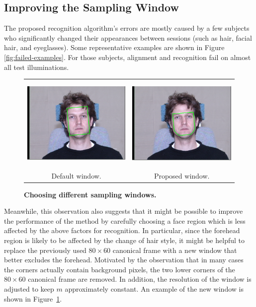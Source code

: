 \subsection{Improving the Sampling Window}
The proposed recognition algorithm's errors are mostly caused by a few subjects who
significantly changed their appearances between sessions (such
as hair, facial hair, and eyeglasses). Some representative
examples are shown in Figure \ref{fig:failed-examples}. For those subjects, alignment and recognition fail on
almost all test illuminations.
\begin{figure}[b]
\centering
{
\begin{tabular}{@{}cc@{}}
\includegraphics[trim=1.9in .7in 1.9in .5in, clip, height=1.8in]{figures_pami/example.png} &
\includegraphics[trim=1.9in .7in 1.9in .5in, clip, height=1.8in]{figures_pami/example_new.png} \\
Default window. & Proposed window.
\end{tabular}
}
\caption{\small{\bf Choosing different sampling windows.}}
\label{fig:new-mask}
\end{figure}
Meanwhile, this observation also suggests that it might be possible to improve
the performance of the method by carefully choosing a face region which is less
affected by the above factors for recognition. In particular, since the
forehead region is likely to be affected by the change of hair style, it might
be helpful to replace the previously used $80 \times 60$ canonical frame with a
new window that better excludes the forehead.  Motivated by the observation
that in many cases the corners actually contain
background pixels, the two lower corners of the $80 \times 60$ canonical frame
are removed.  In addition, the resolution of the window is adjusted to keep $m$
approximately constant.  An example of the new window is shown in
Figure~\ref{fig:new-mask}.

